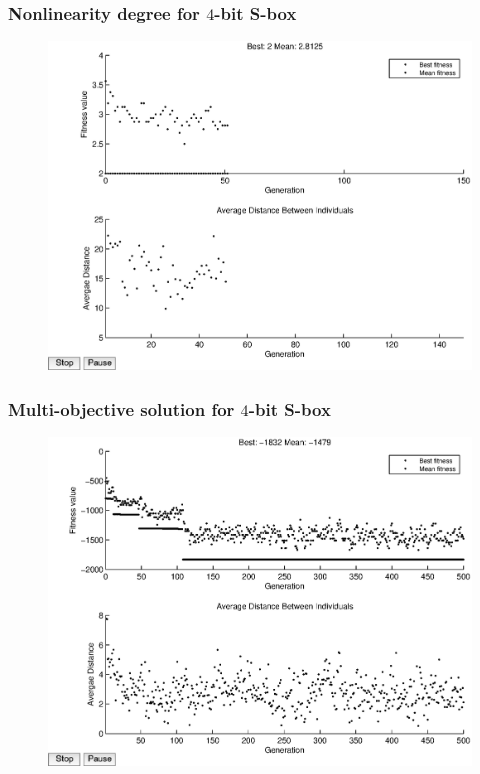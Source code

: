 \documentclass[handout]{beamer}
\begin{document}
\begin{frame}
	\frametitle{Nonlinearity degree for $4$-bit S-box}
\begin{figure}
	\centering
	\includegraphics[scale=0.5]{images/nl_results16.eps} 
\end{figure}
\end{frame}

\begin{frame}
	\frametitle{Multi-objective solution for $4$-bit S-box}
\begin{figure}
	\centering
	\includegraphics[scale=0.5]{images/joint_results16.eps} 
\end{figure}
\end{frame}
\end{document}
